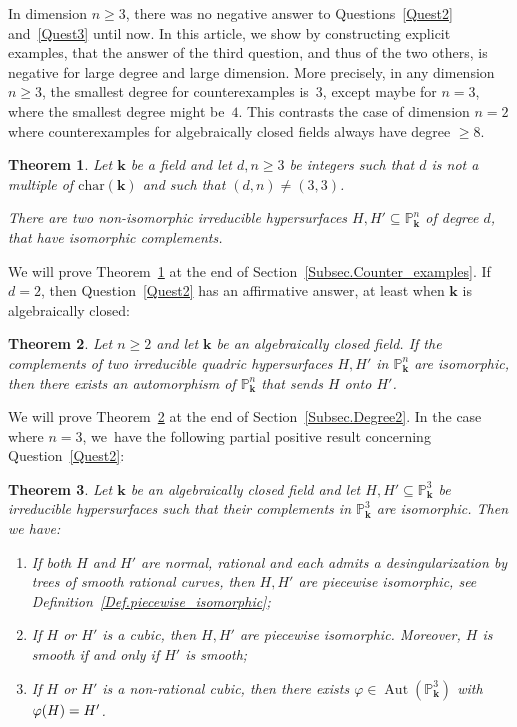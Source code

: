 \documentclass[JEP,XML,SOM,Unicode,NoFloatCountersInSection,published]{cedram}
\newtheorem{maintheorem}{Theorem}
\theoremstyle{definition}
\renewcommand\k{{\mathbf k}}
\newcommand\p{{\mathbb P}}\let\PP\p
\newcommand{\kk}{\mathbf{k}}
\DeclareMathOperator{\Aut}{Aut}
\begin{document}
In dimension $n\ge 3$, there was no negative answer to Questions~\eqref{Quest2} and~\eqref{Quest3}
until now. In this article, we show by constructing explicit examples,
that the answer of the third question, and thus of the two others, is negative for large degree and large dimension.
More precisely, in any dimension $n\ge 3$, the smallest degree for counterexamples is~$3$, except maybe for $n=3$, where the smallest degree might be~$4$. This contrasts the case of dimension $n=2$ where counterexamples
for algebraically closed fields always have degree $\ge 8$.

\begin{maintheorem}\label{34and43}
Let $\kk$ be a field and let $d,n \ge 3$ be integers such that $d$ is not a multiple of $\mathrm{char}(\kk)$ and such that $(d,n)\neq (3,3)$.

There are two non-isomorphic irreducible hypersurfaces $H,H'\subseteq \p^n_\k$ of degree $d$, that have isomorphic complements.
\end{maintheorem}

We will prove Theorem~\ref{34and43} at the end of Section~\ref{Subsec.Counter_examples}. If $d = 2$, then Question~\eqref{Quest2} has an affirmative answer,
at least when $\k$ is algebraically closed:

\begin{maintheorem}
\label{Thm.Degree2}
Let $n \geq 2$ and let $\kk$ be an algebraically closed field.
If the complements of two irreducible quadric hypersurfaces $H, H'$ in $\PP^n_{\kk}$ are isomorphic, then
there exists an automorphism of $\PP^n_\kk$ that sends $H$ onto $H'$.
\end{maintheorem}

We will prove Theorem~\ref{Thm.Degree2} at the end of Section~\ref{Subsec.Degree2}.
In the case where $n = 3$, we~have the following partial positive result
concerning Question~\eqref{Quest2}:

\begin{maintheorem}
\label{Thm.Degree3n3}
Let $\kk$ be an algebraically closed field and let $H, H' \subseteq \PP^3_{\kk}$
be irreducible hypersurfaces such that their complements in $\PP^3_{\kk}$ are isomorphic.
Then we have:
\begin{enumerate}
\item \label{Thm.Degree3n3.1}
If both $H$ and $H'$ are normal, rational and each admits a desingularization by trees of smooth rational curves, then
$H, H'$ are piecewise isomorphic, see Definition~\ref{Def.piecewise_isomorphic};
\item \label{Thm.Degree3n3.2}
If $H$ or $H'$ is a cubic, then $H, H'$ are piecewise isomorphic.
Moreover, $H$ is smooth if and only if $H'$ is smooth;
\item \label{Thm.Degree3n3.3}
If $H$ or $H'$ is a non-rational cubic, then there exists $\varphi \in \Aut(\PP^3_{\kk})$
with $\varphi(H) =\nobreak H'$.
\end{enumerate}
\end{maintheorem}
\end{document}
